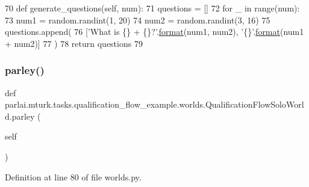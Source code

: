 \begin{DoxyCode}
70     \textcolor{keyword}{def }generate\_questions(self, num):
71         questions = []
72         \textcolor{keywordflow}{for} \_ \textcolor{keywordflow}{in} range(num):
73             num1 = random.randint(1, 20)
74             num2 = random.randint(3, 16)
75             questions.append(
76                 [\textcolor{stringliteral}{'What is \{\} + \{\}?'}.\hyperlink{namespaceparlai_1_1chat__service_1_1services_1_1messenger_1_1shared__utils_a32e2e2022b824fbaf80c747160b52a76}{format}(num1, num2), \textcolor{stringliteral}{'\{\}'}.\hyperlink{namespaceparlai_1_1chat__service_1_1services_1_1messenger_1_1shared__utils_a32e2e2022b824fbaf80c747160b52a76}{format}(num1 + num2)]
77             )
78         \textcolor{keywordflow}{return} questions
79 
\end{DoxyCode}
\mbox{\label{classparlai_1_1mturk_1_1tasks_1_1qualification__flow__example_1_1worlds_1_1QualificationFlowSoloWorld_a47ce01979febfd35c072cae4f92ecdba}} 
\subsubsection{\texorpdfstring{parley()}{parley()}}
{\footnotesize\ttfamily def parlai.\+mturk.\+tasks.\+qualification\+\_\+flow\+\_\+example.\+worlds.\+Qualification\+Flow\+Solo\+World.\+parley (\begin{DoxyParamCaption}\item[{}]{self }\end{DoxyParamCaption})}



Definition at line 80 of file worlds.\+py.



